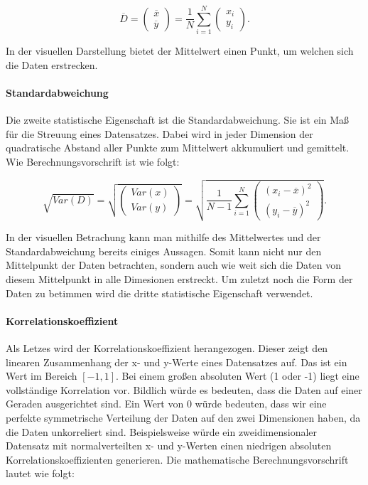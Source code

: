 \documentclass[sigconf]{acmart}
\begin{document}
$$
\overline{D} = \left( \begin{array}{c} \overline{x} \\ \overline{y}  \end{array}\right) = \frac 1 N \sum_{i=1}^{N} \left( \begin{array}{c} x_i \\ y_i  \end{array}\right).
$$

In der visuellen Darstellung bietet der Mittelwert einen Punkt, um welchen sich die Daten erstrecken. 

\paragraph{Standardabweichung}

Die zweite statistische Eigenschaft ist die Standardabweichung. Sie ist ein Maß für die Streuung eines Datensatzes. Dabei wird in jeder Dimension der quadratische Abstand aller Punkte zum Mittelwert akkumuliert und gemittelt. Wie Berechnungsvorschrift ist wie folgt:  

$$
\sqrt{Var(D)}=\sqrt{\left( \begin{array}{c} Var(x) \\ Var(y)  \end{array}\right)} = \sqrt{\frac{1}{N-1} \sum_{i=1}^{N} \left( \begin{array}{c} (x_i-\overline{x})^2  \\ (y_i-\overline{y})^2  \end{array}\right)}.
$$

In der visuellen Betrachung kann man mithilfe des Mittelwertes und der Standardabweichung bereits einiges Aussagen. Somit kann nicht nur den Mittelpunkt der Daten betrachten, sondern auch wie weit sich die Daten von diesem Mittelpunkt in alle Dimesionen erstreckt. Um zuletzt noch die Form der Daten zu betimmen wird die dritte statistische Eigenschaft verwendet.

\paragraph{Korrelationskoeffizient}

Als Letzes wird der Korrelationskoeffizient herangezogen. Dieser zeigt den linearen Zusammenhang der x- und y-Werte eines Datensatzes auf. Das ist ein Wert im Bereich $[-1,1]$. Bei einem großen absoluten Wert (1 oder -1) liegt eine vollständige Korrelation vor. Bildlich würde es bedeuten, dass die Daten auf einer Geraden ausgerichtet sind. Ein Wert von 0 würde bedeuten, dass wir eine perfekte symmetrische Verteilung der Daten auf den zwei Dimensionen haben, da die Daten unkorreliert sind. Beispielsweise würde ein zweidimensionaler Datensatz mit normalverteilten x- und y-Werten einen niedrigen absoluten Korrelationskoeffizienten generieren. Die mathematische Berechnungsvorschrift lautet wie folgt:
\end{document}
